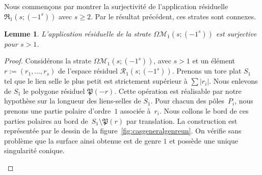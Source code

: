 \documentclass[JEP,XML,SOM,Unicode,francais,NoFloatCountersInSection,published]{cedram}
\let\mathcal\mathscr
\newcommand{\appres}[1][g]{\mathfrak{R}_{#1}}
\newcommand{\espres}[1][g]{\mathcal{R}_{#1}}
\newcommand{\omoduli}[1][g]{{\Omega\mathcal M}_{\!#1}}
\newtheorem{lem}[thm]{Lemme}
\theoremstyle{definition}
\begin{document}
Nous commençons par montrer la surjectivité de l'application résiduelle $\appres[1]\!(s;\!(-1^{s}))$ avec $s\geq2$. Par le résultat précédent, ces strates sont connexes.
\begin{lem}\label{lem:gunspe1}
L'application résiduelle de la strate $\omoduli[1](s;(-1^{s}))$ est surjective pour $s>1$.
\end{lem}
\begin{proof}
Considérons la strate $\omoduli[1](s;(-1^{s}))$, avec $s>1$ et un élément $r:=(r_{1},\dots,r_{s})$ de l'espace résiduel $\espres[1](s;(-1^{s}))$. Prenons un tore plat $S_{1}$ tel que le lien selle le plus petit est strictement supérieur à $\sum|r_{i}|$. Nous enlevons de $S_{1}$ le polygone résiduel $\mathfrak{P}(-r)$. Cette opération est réalisable par notre hypothèse sur la longueur des liens-selles de $S_{1}$.
Pour chacun des pôles~$P_{i}$, nous prenons une partie polaire d'ordre~$1$ associée à~$r_{i}$. Nous collons le bord de ces parties polaires au bord de~$S_{1}\setminus \mathfrak{P}(r)$ par translation. La construction est représentée par le dessin de la figure~\ref{fig:casgeneralgenreun}. On vérifie sans problème que la surface ainsi obtenue est de genre $1$ et possède une unique singularité conique.
\begin{figure}[htb]
\center
{}
\end{figure}
\end{proof}
\end{document}
